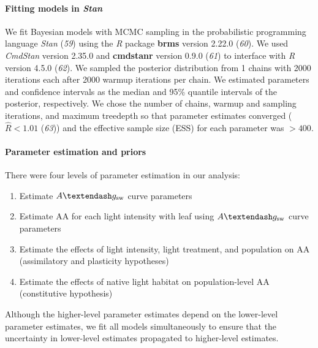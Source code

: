 \documentclass[
  letterpaper,
  DIV=11,
  numbers=noendperiod]{scrartcl}
\let\oldparagraph\paragraph
\renewcommand{\paragraph}[1]{\oldparagraph{#1}\mbox{}}
\providecommand{\tightlist}{%
  \setlength{\itemsep}{0pt}\setlength{\parskip}{0pt}}\usepackage{longtable,booktabs,array}
\newcommand{\aax}{$\mathrm{AA}$}
\newcommand{\agcurve}{$A \textendash g_\text{sw}$}
\begin{document}
\paragraph{\texorpdfstring{Fitting models in
\emph{Stan}}{Fitting models in Stan}}\label{sec-fitting}

We fit Bayesian models with MCMC sampling in the probabilistic
programming language \emph{Stan} (\emph{59}) using the \emph{R} package
\textbf{brms} version 2.22.0 (\emph{60}). We used \emph{CmdStan} version
2.35.0 and \textbf{cmdstanr} version 0.9.0 (\emph{61}) to interface with
\emph{R} version 4.5.0 (\emph{62}). We sampled the posterior
distribution from 1 chains with 2000 iterations each after 2000 warmup
iterations per chain. We estimated parameters and confidence intervals
as the median and 95\% quantile intervals of the posterior,
respectively. We chose the number of chains, warmup and sampling
iterations, and maximum treedepth so that parameter estimates converged
(\(\hat{R} < 1.01\) (\emph{63})) and the effective sample size (ESS) for
each parameter was \(> 400\).

\paragraph{Parameter estimation and priors}\label{sec-parameters}

There were four levels of parameter estimation in our analysis:

\begin{enumerate}
\def\labelenumi{\arabic{enumi}.}
\tightlist
\item
  Estimate \agcurve{} curve parameters
\item
  Estimate \aax{} for each light intensity with leaf using \agcurve{}
  curve parameters
\item
  Estimate the effects of light intensity, light treatment, and
  population on \aax{} (assimilatory and plasticity hypotheses)
\item
  Estimate the effects of native light habitat on population-level
  \aax{} (constitutive hypothesis)
\end{enumerate}

Although the higher-level parameter estimates depend on the lower-level
parameter estimates, we fit all models simultaneously to ensure that the
uncertainty in lower-level estimates propagated to higher-level
estimates.
\end{document}
